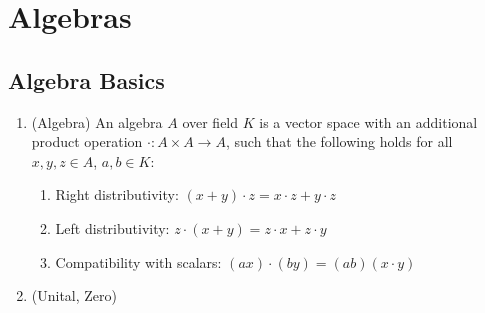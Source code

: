 \section{Algebras}
\label{sec:algebras}

\subsection{Algebra Basics}
\begin{enumerate}
    \item (Algebra) An algebra $A$ over field $K$ is a vector space with an additional product operation $\cdot: A \times A \to A$, such that the following holds for all $x,y,z\in A$, $a,b\in K$:
        \begin{enumerate}
            \item Right distributivity: $(x+y)\cdot z = x\cdot z + y\cdot z$
            \item Left distributivity: $z \cdot (x+y) = z\cdot x + z\cdot y$
            \item Compatibility with scalars: $(ax) \cdot (by)= (ab) (x\cdot y)$
        \end{enumerate}
    \item (Unital, Zero)
\end{enumerate}

